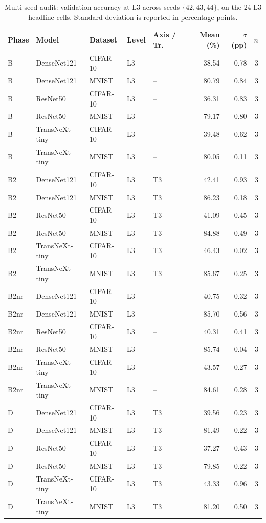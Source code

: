\begin{table}[htbp]
\centering
\caption{Multi-seed audit: validation accuracy at L3 across seeds $\{42, 43, 44\}$, on the 24 L3 headline cells. Standard deviation is reported in percentage points.}
\label{tab:multiseed}
\setlength{\tabcolsep}{4pt}
\renewcommand{\arraystretch}{1.1}
\begin{tabular}{lllllrrr}
\toprule
Phase & Model & Dataset & Level & Axis / Tr. & Mean (\%) & $\sigma$ (pp) & $n$ \\
\midrule
B & DenseNet121 & CIFAR-10 & L3 & -- & 38.54 & 0.78 & 3 \\
B & DenseNet121 & MNIST & L3 & -- & 80.79 & 0.84 & 3 \\
B & ResNet50 & CIFAR-10 & L3 & -- & 36.31 & 0.83 & 3 \\
B & ResNet50 & MNIST & L3 & -- & 79.17 & 0.80 & 3 \\
B & TransNeXt-tiny & CIFAR-10 & L3 & -- & 39.48 & 0.62 & 3 \\
B & TransNeXt-tiny & MNIST & L3 & -- & 80.05 & 0.11 & 3 \\
B2 & DenseNet121 & CIFAR-10 & L3 & T3 & 42.41 & 0.93 & 3 \\
B2 & DenseNet121 & MNIST & L3 & T3 & 86.23 & 0.18 & 3 \\
B2 & ResNet50 & CIFAR-10 & L3 & T3 & 41.09 & 0.45 & 3 \\
B2 & ResNet50 & MNIST & L3 & T3 & 84.88 & 0.49 & 3 \\
B2 & TransNeXt-tiny & CIFAR-10 & L3 & T3 & 46.43 & 0.02 & 3 \\
B2 & TransNeXt-tiny & MNIST & L3 & T3 & 85.67 & 0.25 & 3 \\
B2nr & DenseNet121 & CIFAR-10 & L3 & -- & 40.75 & 0.32 & 3 \\
B2nr & DenseNet121 & MNIST & L3 & -- & 85.70 & 0.56 & 3 \\
B2nr & ResNet50 & CIFAR-10 & L3 & -- & 40.31 & 0.41 & 3 \\
B2nr & ResNet50 & MNIST & L3 & -- & 85.74 & 0.04 & 3 \\
B2nr & TransNeXt-tiny & CIFAR-10 & L3 & -- & 43.57 & 0.27 & 3 \\
B2nr & TransNeXt-tiny & MNIST & L3 & -- & 84.61 & 0.28 & 3 \\
D & DenseNet121 & CIFAR-10 & L3 & T3 & 39.56 & 0.23 & 3 \\
D & DenseNet121 & MNIST & L3 & T3 & 81.49 & 0.22 & 3 \\
D & ResNet50 & CIFAR-10 & L3 & T3 & 37.27 & 0.43 & 3 \\
D & ResNet50 & MNIST & L3 & T3 & 79.85 & 0.22 & 3 \\
D & TransNeXt-tiny & CIFAR-10 & L3 & T3 & 43.33 & 0.96 & 3 \\
D & TransNeXt-tiny & MNIST & L3 & T3 & 81.20 & 0.50 & 3 \\
\bottomrule
\end{tabular}
\end{table}
